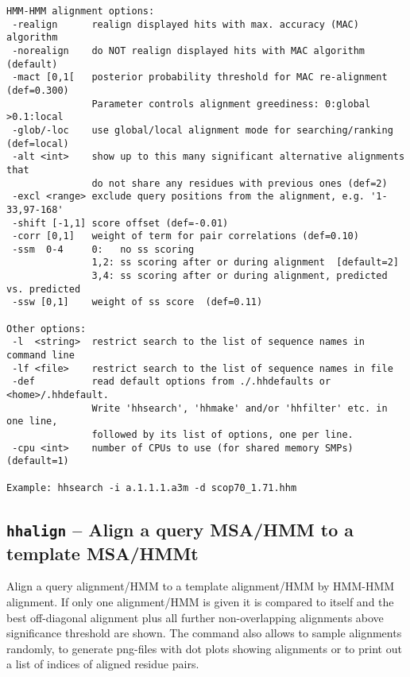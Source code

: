 \documentclass[11pt,a4paper]{article}
\begin{document}
\begin{verbatim}
HMM-HMM alignment options:                                                    
 -realign      realign displayed hits with max. accuracy (MAC) algorithm 
 -norealign    do NOT realign displayed hits with MAC algorithm (default)     
 -mact [0,1[   posterior probability threshold for MAC re-alignment (def=0.300)
               Parameter controls alignment greediness: 0:global >0.1:local
 -glob/-loc    use global/local alignment mode for searching/ranking (def=local)
 -alt <int>    show up to this many significant alternative alignments that
               do not share any residues with previous ones (def=2)
 -excl <range> exclude query positions from the alignment, e.g. '1-33,97-168' 
 -shift [-1,1] score offset (def=-0.01)                                       
 -corr [0,1]   weight of term for pair correlations (def=0.10)                
 -ssm  0-4     0:   no ss scoring                                             
               1,2: ss scoring after or during alignment  [default=2]       
               3,4: ss scoring after or during alignment, predicted vs. predicted 
 -ssw [0,1]    weight of ss score  (def=0.11)                                

Other options:                                                                
 -l  <string>  restrict search to the list of sequence names in command line  
 -lf <file>    restrict search to the list of sequence names in file          
 -def          read default options from ./.hhdefaults or <home>/.hhdefault.  
               Write 'hhsearch', 'hhmake' and/or 'hhfilter' etc. in one line, 
               followed by its list of options, one per line.
 -cpu <int>    number of CPUs to use (for shared memory SMPs) (default=1)

Example: hhsearch -i a.1.1.1.a3m -d scop70_1.71.hhm             
\end{verbatim} \normalsize

\subsection{{\tt hhalign} -- Align a query MSA/HMM to a template MSA/HMMt}

Align a query alignment/HMM to a template alignment/HMM by HMM-HMM alignment.
If only one alignment/HMM is given it is compared to itself and the best
off-diagonal alignment plus all further non-overlapping alignments above 
significance threshold are shown. The command also allows to sample
alignments randomly, to generate png-files with dot plots showing 
alignments or to print out a list of indices of aligned residue pairs. 
\end{document}

